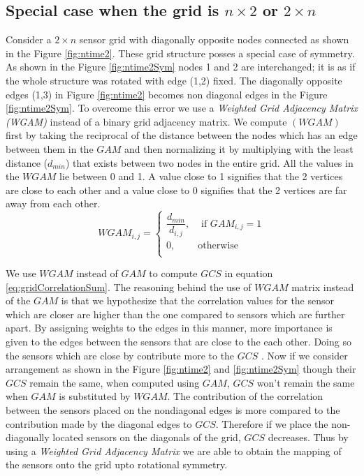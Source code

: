\subsection{Special case when the grid is $n \times 2$ or $2 \times n$}
Consider a $2 \times n$ sensor grid with diagonally opposite nodes connected as shown in the Figure \ref{fig:ntime2}. These grid structure posses a special case of symmetry. As shown in the  Figure \ref{fig:ntime2Sym} nodes 1 and 2 are interchanged; it is as if the whole structure was rotated with  edge (1,2) fixed. The diagonally opposite edges (1,3) in Figure \ref{fig:ntime2} becomes non diagonal edges in the Figure \ref{fig:ntime2Sym}. To overcome this error we use a \textit{Weighted Grid Adjacency Matrix (WGAM)} instead of a binary grid adjacency matrix. We compute $(WGAM)$ first by taking the reciprocal of the distance between the nodes which has an edge between them in the $GAM$ and then normalizing it by multiplying with the least distance ($d_{min}$) that exists between two nodes in the entire grid. All the values in the $WGAM$  lie between 0 and 1. A value close to 1 signifies that the 2 vertices are close to each other and a value close to 0 signifies that the 2 vertices are far away from each other.
\begin{equation}
WGAM_{i,j} = 
\begin{cases}
\dfrac{d_{min}}{d_{i,j}}, &\text{ if } GAM_{i,j} = 1\\
0, & \text{otherwise}\\
\end{cases}
\end{equation}

We use $WGAM$ instead of $GAM$ to compute $GCS$ in equation \ref{eq:gridCorrelationSum}. The reasoning behind the use of $WGAM$ matrix instead of the $GAM$ is that we hypothesize that the correlation values for the sensor which are closer are higher than the one compared to sensors which are further apart. By assigning weights to the edges in this manner, more importance is given to the edges between the sensors that are close to the each other. Doing so the sensors which are close by contribute  more to the $GCS$ . 
Now if we consider arrangement as shown in the Figure \ref{fig:ntime2} and \ref{fig:ntime2Sym} though their $GCS$ remain the same, when computed using $GAM$, $GCS$ won't remain the same when $GAM$ is substituted by $WGAM$. The contribution of the correlation between the sensors placed on the nondiagonal edges is more compared to the contribution made by the diagonal edges to $GCS$. Therefore if we place the non-diagonally located sensors on the diagonals of the grid, $GCS$ decreases. Thus by using a \textit{Weighted Grid Adjacency Matrix} we are able to obtain the mapping of the sensors onto the grid upto rotational symmetry.

